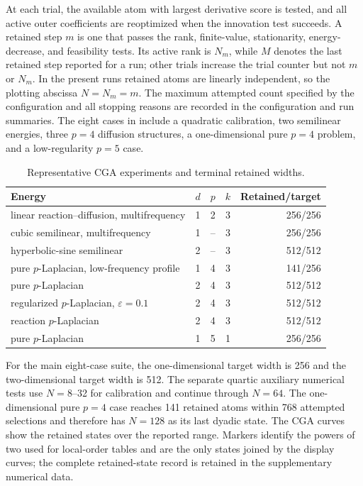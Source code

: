 At each trial, the available atom with largest derivative score is tested, and all active outer
coefficients are reoptimized when the innovation test succeeds. A retained step \(m\) is one that passes
the rank, finite-value, stationarity, energy-decrease, and feasibility tests. Its active rank is
\(N_m\), while \(M\) denotes the last retained step reported for a run; other trials increase
the trial counter but not \(m\) or \(N_m\). In the present runs retained atoms are linearly independent, so the
plotting abscissa \(N=N_m=m\). The maximum attempted count specified by the configuration and all stopping reasons are
recorded in the configuration and run summaries. The eight cases in  include a
quadratic calibration, two semilinear energies, three \(p=4\) diffusion structures, a
one-dimensional pure \(p=4\) problem, and a low-regularity \(p=5\) case.

\begin{table}[!htbp]
\centering
\small
\caption{Representative CGA experiments and terminal retained widths.}
\label{tab:cases}
\begin{tabular}{@{}lcccr@{}}
\toprule
Energy & \(d\) & \(p\) & \(k\) & Retained/target \\
\midrule
linear reaction--diffusion, multifrequency & 1 & 2 & 3 & 256/256 \\
cubic semilinear, multifrequency & 1 & -- & 3 & 256/256 \\
hyperbolic-sine semilinear & 2 & -- & 3 & 512/512 \\
pure \(p\)-Laplacian, low-frequency profile & 1 & 4 & 3 & 141/256 \\
pure \(p\)-Laplacian & 2 & 4 & 3 & 512/512 \\
regularized \(p\)-Laplacian, \(\varepsilon=0.1\) & 2 & 4 & 3 & 512/512 \\
reaction \(p\)-Laplacian & 2 & 4 & 3 & 512/512 \\
pure \(p\)-Laplacian & 1 & 5 & 1 & 256/256 \\
\bottomrule
\end{tabular}
\end{table}

For the main eight-case suite, the one-dimensional target width is 256 and the
two-dimensional target width is 512. The separate quartic auxiliary numerical tests use
\(N=8\)--32 for calibration and continue through \(N=64\). The
one-dimensional pure \(p=4\) case reaches 141 retained atoms within 768 attempted selections and
therefore has \(N=128\) as its last dyadic
state. The CGA curves show the retained states over the reported range. Markers identify the
powers of two used for local-order tables and are the only states joined by the display curves; the
complete retained-state record is retained in the supplementary numerical data.

